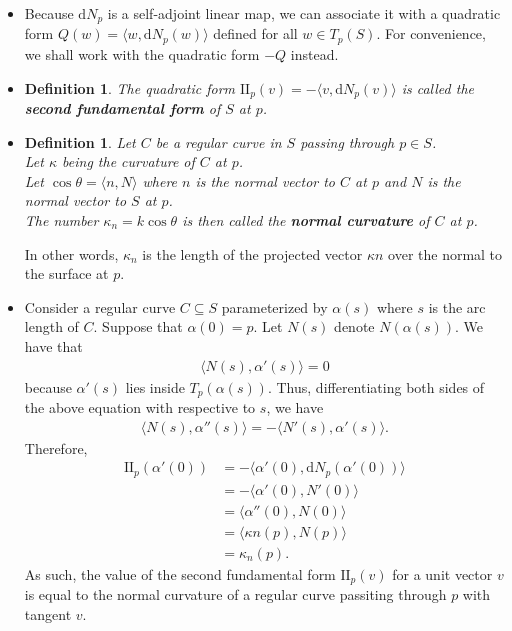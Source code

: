 \documentclass[10pt]{article}
\newtheorem{definition}[lemma]{Definition}
\newcommand{\dee}{\mathrm{d}}
\newcommand{\sseq}{\subseteq}
\newcommand{\II}{\mathrm{II}}
\begin{document}
  \begin{itemize}
    \item Because $\dee N_p$ is a self-adjoint linear map, we can associate it with a quadratic form $Q(w) = \langle w, \dee N_p(w) \rangle$ defined for all $w \in T_p(S)$. For convenience, we shall work with the quadratic form $-Q$ instead.

    \item \begin{definition}
      The quadratic form $\II_p(v) = -\langle v, \dee N_p(v) \rangle$ is called the {\bf second fundamental form} of $S$ at $p$.
    \end{definition}

    \item \begin{definition}
      Let $C$ be a regular curve in $S$ passing through $p \in S$.\\
      Let $\kappa$ being the curvature of $C$ at $p$.\\
      Let $\cos \theta = \langle n, N \rangle$ where $n$ is the normal vector to $C$ at $p$ and $N$ is the normal vector to $S$ at $p$.\\
      The number $\kappa_{n} = k \cos \theta$ is then called the {\bf normal curvature} of $C$  at $p$.
    \end{definition}

    In other words, $\kappa_n$ is the length of the projected vector $\kappa n$ over the normal to the surface at $p$.

    \item Consider a regular curve $C \sseq S$ parameterized by $\alpha(s)$ where $s$ is the arc length of $C$. Suppose that $\alpha(0) = p$. Let $N(s)$ denote $N(\alpha(s))$. We have that
    \begin{align*}
      \langle N(s), \alpha'(s) \rangle = 0
    \end{align*}
    because $\alpha'(s)$ lies inside $T_p(\alpha(s))$. Thus, differentiating both sides of the above equation with respective to $s$, we have
    \begin{align*}
      \langle N(s), \alpha''(s) \rangle = -\langle N'(s), \alpha'(s) \rangle.
    \end{align*}
    Therefore,
    \begin{align*}
      \II_p(\alpha'(0)) 
      &= -\langle \alpha'(0), \dee N_p(\alpha'(0)) \rangle\\
      &= -\langle \alpha'(0), N'(0) \rangle\\
      &= \langle \alpha''(0), N(0) \rangle\\
      &= \langle \kappa n(p), N(p) \rangle\\
      &= \kappa_n(p).
    \end{align*}
    As such, the value of the second fundamental form $\II_p(v)$ for a unit vector $v$ is equal to the normal curvature of a regular curve passiting through $p$ with tangent $v$.


\end{itemize}
\end{document}
